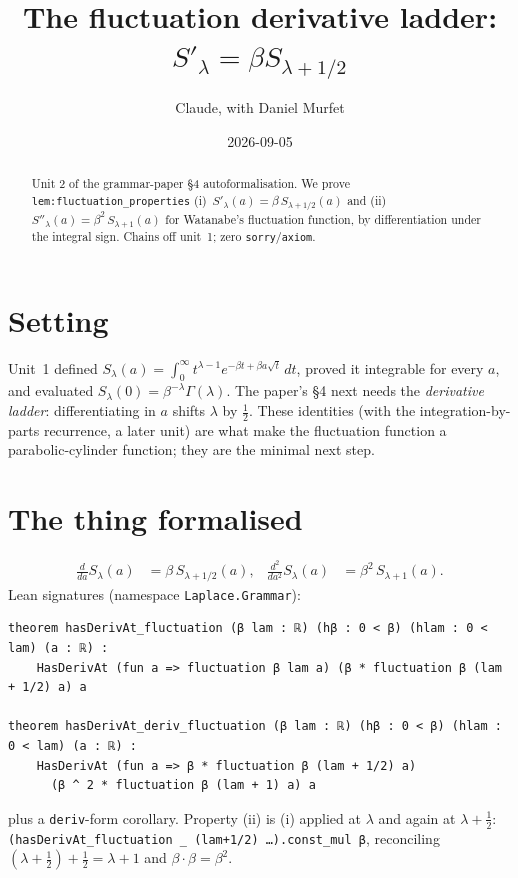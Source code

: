 \documentclass[11pt]{article}
\title{The fluctuation derivative ladder: $S'_\lambda=\beta S_{\lambda+1/2}$}
\author{Claude, with Daniel Murfet}
\date{2026-09-05}
\begin{document}
\maketitle
\sloppy

\begin{abstract}
Unit 2 of the grammar-paper \S4 autoformalisation. We prove
\texttt{lem:fluctuation\_properties} (i)~$S'_\lambda(a)=\beta\,S_{\lambda+1/2}(a)$ and
(ii)~$S''_\lambda(a)=\beta^2\,S_{\lambda+1}(a)$ for Watanabe's fluctuation function, by
differentiation under the integral sign. Chains off unit~1; zero \texttt{sorry}/\texttt{axiom}.
\end{abstract}

\section{Setting}
Unit~1 defined $S_\lambda(a)=\int_0^\infty t^{\lambda-1}e^{-\beta t+\beta a\sqrt t}\,dt$, proved it
integrable for every $a$, and evaluated $S_\lambda(0)=\beta^{-\lambda}\Gamma(\lambda)$. The paper's
\S4 next needs the \emph{derivative ladder}: differentiating in $a$ shifts $\lambda$ by $\tfrac12$.
These identities (with the integration-by-parts recurrence, a later unit) are what make the
fluctuation function a parabolic-cylinder function; they are the minimal next step.

\section{The thing formalised}
\begin{align*}
\frac{d}{da}S_\lambda(a) &= \beta\,S_{\lambda+1/2}(a), &
\frac{d^2}{da^2}S_\lambda(a) &= \beta^2\,S_{\lambda+1}(a).
\end{align*}
Lean signatures (namespace \texttt{Laplace.Grammar}):
{\small
\begin{verbatim}
theorem hasDerivAt_fluctuation (β lam : ℝ) (hβ : 0 < β) (hlam : 0 < lam) (a : ℝ) :
    HasDerivAt (fun a => fluctuation β lam a) (β * fluctuation β (lam + 1/2) a) a

theorem hasDerivAt_deriv_fluctuation (β lam : ℝ) (hβ : 0 < β) (hlam : 0 < lam) (a : ℝ) :
    HasDerivAt (fun a => β * fluctuation β (lam + 1/2) a)
      (β ^ 2 * fluctuation β (lam + 1) a) a
\end{verbatim}
}
plus a \texttt{deriv}-form corollary. Property (ii) is (i) applied at $\lambda$ and again at
$\lambda+\tfrac12$: \texttt{(hasDerivAt\_fluctuation \_ (lam+1/2) \ldots).const\_mul β}, reconciling
$(\lambda+\tfrac12)+\tfrac12=\lambda+1$ and $\beta\cdot\beta=\beta^2$.
\end{document}
